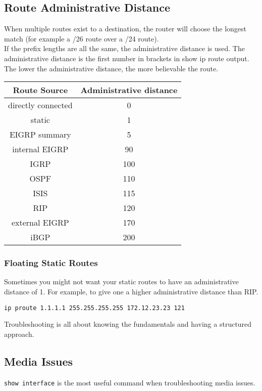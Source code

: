 \subsection{Route Administrative Distance}

When multiple routes exist to a destination, the router will choose the
longest match (for example a /26 route over a /24 route).\\

If the prefix lengths are all the same, the administrative distance is used.
The administrative distance is the first number in brackets in show ip route
output. The lower the administrative distance, the more believable the
route.\\

\begin{tabular}{ | c | c | }
\hline
Route Source & Administrative distance \\ \hline
directly connected &   0 \\ \hline
static             &   1 \\ \hline
EIGRP summary      &   5 \\ \hline
internal EIGRP     &  90 \\ \hline
IGRP               & 100 \\ \hline
OSPF               & 110 \\ \hline
ISIS               & 115 \\ \hline
RIP                & 120 \\ \hline
external EIGRP     & 170 \\ \hline
iBGP               & 200 \\ \hline
\end{tabular}

\subsubsection{Floating Static Routes}

Sometimes you might not want your static routes to have an administrative
distance of 1. For example, to give one a higher administrative distance than
RIP.

\begin{verbatim}
ip proute 1.1.1.1 255.255.255.255 172.12.23.23 121
\end{verbatim}

Troubleshooting is all about knowing the fundamentals and having a structured
approach.

\subsection{Media Issues}

\texttt{show interface} is the most useful command when troubleshooting media
issues.
